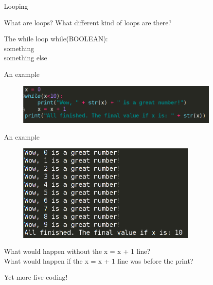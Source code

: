 \documentclass{beamer}
\begin{document}
\begin{frame}{Looping}

What are loops?
\pause
What different kind of loops are there?

\end{frame}

\begin{frame}{The while loop}
while(BOOLEAN):\\
            \qquad something\\
            \qquad something else\\
\end{frame}

\begin{frame}{An example}
\begin{figure}[h]
\includegraphics[width=0.9\textwidth]{examplewhile}
\end{figure}
\end{frame}

\begin{frame}{An example}
\begin{figure}[h]
\includegraphics[width=0.8\textwidth]{whileoutput}
\end{figure}

\pause
What would happen without the x = x + 1 line?\\

\pause
What would happen if the x = x + 1 line was before the print?

\end{frame}

\begin{frame}
Yet more live coding!
\end{frame}
\end{document}
